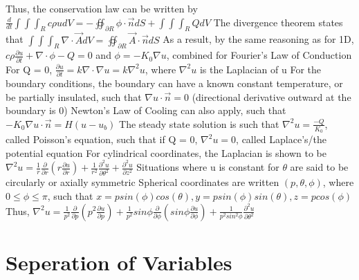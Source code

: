 \documentclass[11 pt, twoside]{article}
\newenvironment{outline*}
{
	\begin{outline}[enumerate]
	}
	{\end{outline}
}
\newcommand\pd[2]{\frac{\partial #1}{\partial #2}}
\begin{document}
\begin{outline*}
	\2 Thus, the conservation law can be written by $\frac{d}{dt} \int\int\int_R c\rho udV = - \oiint_{\partial R} \phi \cdot \vec{n}dS + \int\int\int_R QdV$
		\3 The divergence theorem states that $\int\int\int_R \nabla \cdot \vec{A} dV = \oiint_{\partial R} \vec{A} \cdot \vec{n} dS$
	\2 As a result, by the same reasoning as for 1D, $c\rho \pd{u}{t} + \nabla \cdot \phi - Q = 0$ and $\phi = -K_0\nabla u$, combined for Fourier's Law of Conduction
	\2 For Q = 0, $\pd{u}{t} = k\nabla \cdot \nabla u = k\nabla^2 u$, where $\nabla^2 u$ is the Laplacian of u
	\2 For the boundary conditions, the boundary can have a known constant temperature, or be partially insulated, such that $\nabla u \cdot \vec{n} = 0$ (directional derivative outward at the boundary is 0)
		\3 Newton's Law of Cooling can also apply, such that $-K_0 \nabla u \cdot \vec{n} = H(u - u_b)$
	\2 The steady state solution is such that $\nabla^2u = \frac{-Q}{K_0}$, called Poisson's equation, such that if Q = 0, $\nabla^2u = 0$, called Laplace's/the potential equation
\1 For cylindrical coordinates, the Laplacian is shown to be $\nabla^2 u = \frac{1}{r}\pd{}{r}(r\pd{u}{r}) + \frac{1}{r^2}\pd{^2u}{\theta^2} + \pd{^2u}{z^2}$
	\2 Situations where u is constant for $\theta$ are said to be circularly or axially symmetric
	\2 Spherical coordinates are written $(p, \theta, \phi)$, where $0 \leq \phi \leq \pi$, such that $x = psin(\phi)cos(\theta), y = psin(\phi)sin(\theta), z = pcos(\phi)$
		\3 Thus, $\nabla^2u = \frac{1}{p^2}\pd{}{p}(p^2\pd{u}{p}) + \frac{1}{p^2}{sin\phi}\pd{}{\phi}(sin\phi\pd{u}{\phi}) + \frac{1}{p^2sin^2\phi}\pd{^2u}{\theta^2}$
\end{outline*}
\section{Seperation of Variables}
\end{document}
